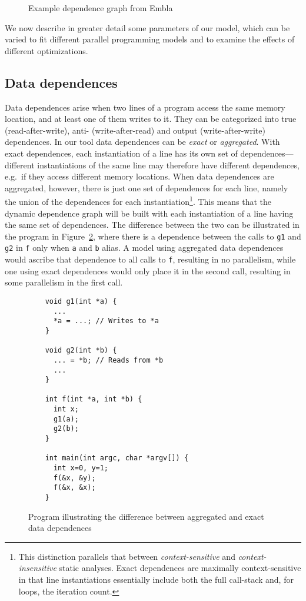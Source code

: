 \begin{figure}
  \begin{center}
  \small
  
  \end{center}
  \caption{Example dependence graph from Embla}
  \label{example-depgraph}
\end{figure}

We now describe in greater detail some parameters of our model, which can be varied to fit different parallel programming models and to examine the effects of different optimizations.

\subsection{Data dependences}
Data dependences arise when two lines of a program access the same memory location, and at least one of them writes to it.
They can be categorized into true (read-after-write), anti- (write-after-read) and output (write-after-write) dependences.
In our tool data dependences can be \emph{exact} or \emph{aggregated}.
With exact dependences, each instantiation of a line has its own set of dependences---different instantiations of the same line may therefore have different dependences, e.g.\ if they access different memory locations.
When data dependences are aggregated, however, there is just one set of dependences for each line, namely the union of the dependences for each instantiation\footnote{
This distinction parallels that between {\em context-sensitive} and
{\em context-insensitive} static analyses.
Exact dependences are maximally context-sensitive in that line instantiations
essentially include both the full call-stack and, for loops, the iteration
count.}.
This means that the dynamic dependence graph will be built with each instantiation of a line having the same set of dependences.
The difference between the two can be illustrated in the program in Figure~\ref{datadeps}, where there is a dependence between the calls to \texttt{g1} and \texttt{g2} in \texttt{f} only when \texttt{a} and \texttt{b} alias.
A model using aggregated data dependences would ascribe that dependence to all calls to \texttt{f}, resulting in no parallelism, while one using exact dependences would only place it in the second call, resulting in some parallelism in the first call.

\begin{figure}
  \begin{center}
  \small
  \begin{verbatim}
    void g1(int *a) {
      ...
      *a = ...; // Writes to *a
    }
  
    void g2(int *b) {
      ... = *b; // Reads from *b
      ...
    }

    int f(int *a, int *b) {
      int x;
      g1(a);
      g2(b);
    }

    int main(int argc, char *argv[]) {
      int x=0, y=1;
      f(&x, &y);
      f(&x, &x);
    }
  \end{verbatim}
  \end{center}
  \caption{Program illustrating the difference between aggregated and exact data dependences}
  \label{datadeps}
\end{figure}

